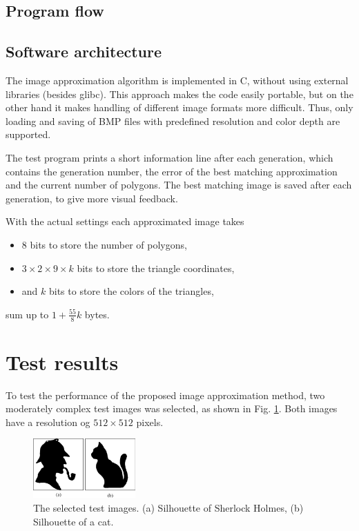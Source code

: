\documentclass[conference]{IEEEtran}
\begin{document}
\subsection{Program flow}



\subsection{Software architecture}

The image approximation algorithm is implemented in C,
without using external libraries (besides glibc). This
approach makes the code easily portable, but on the other
hand it makes handling of different image formats more
difficult. Thus, only loading and saving of BMP files
with predefined resolution and color depth are supported.

The test program prints a short information line after
each generation, which contains the generation number,
the error of the best matching approximation and the
current number of polygons. The best matching image is
saved after each generation, to give more visual feedback.

With the actual settings each approximated image takes

\begin{itemize}

\item{8 bits to store the number of polygons,}

\item{$3 \times 2 \times 9 \times k$ bits to store the triangle
coordinates,}

\item{and $k$ bits to store the colors of the triangles,}

\end{itemize}

sum up to $1+\frac{55}{8}k$ bytes.

\section{Test results}

To test the performance of the proposed image approximation
method, two moderately complex test images was selected,
as shown in Fig. \ref{fig-orig}. Both images have a
resolution og $512 \times 512$ pixels.

\begin{figure}[htbp]
	\centering
	\includegraphics[width=0.35\textwidth]{fig/originals.png}
	\caption{The selected test images.
	(a) Silhouette of Sherlock Holmes,
	(b) Silhouette of a cat.}
	\label{fig-orig}
\end{figure}
\end{document}
